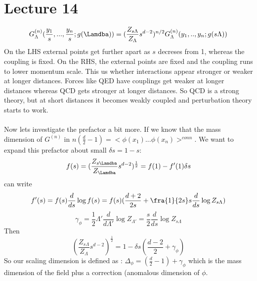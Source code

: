 \documentclass{article}
\begin{document}
  \section{Lecture 14}
  $$
  G_{\Lambda}^{(n)} ( \frac{y_1}{s},..., \frac{y_n}{s}; g(\Lamdba)) = ( \frac{Z_{s\Lambda}}{Z_{\Lambda}} s^{d-2} )^{n/2} G_{\Lambda}^{(n)}(y_1,..,y_n; g(s\Lambda))
  $$
  On the LHS external points get further apart as $s$ decreses from 1, whereas the coupling is fixed. On the RHS, the external points are fixed and the coupling runs to lower momentum scale. This us whether interactions appear stronger or weaker at longer distances. Forces like QED have couplings get weaker at longer distances whereas QCD gets stronger at longer distances. So QCD is a strong theory, but at short distances it becomes weakly coupled and perturbation theory starts to work.\\\\
  Now lets investigate the prefactor a bit more. If we know that the mass dimension of $G^{(n)}$ in $n ( \frac{d}{2} -1) = < \phi(x_1)... \phi(x_n) >^{conn}$. We want to expand this prefactor about small $\delta s = 1-s$:
  $$
   f(s) = ( \frac{Z_{s\Lamdba}}{Z_{\Lamdba}} s^{d-2} )^{\frac{1}{2}} = f(1) - f'(1) \delta s 
  $$
  can write 
  $$
   f'(s) = f(s) \frac{d}{ds} \log f(s) = f(s) ( \frac{d+2}{2s} + \fra{1}{2s} s \frac{d}{ds} \log Z_{s\Lambda})
  $$
  $$
   \gamma_{\phi} = \frac{1}{2} \Lambda' \frac{d}{d\Lambda'} \log Z_{\Lambda'} = \frac{s}{2} \frac{d}{ds} \log Z_{s \Lambda}
  $$
  Then 
  $$
   ( \frac{Z_{s \Lambda}}{Z_{\Lambda}} s^{d-2})^{\frac{1}{2}} = 1 - \delta s( \frac{d-2}{2} + \gamma_{\phi})
  $$
  So our scaling dimension is defined as : $\Delta_{\phi} = ( \frac{d}{2} - 1) + \gamma_{\phi}$ which is the mass dimension of the field plus a correction (anomalous dimension of $\phi$.
\end{document}
